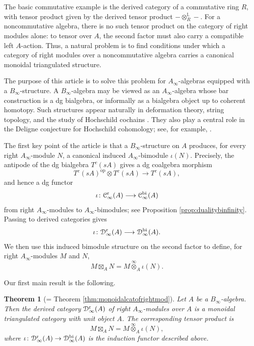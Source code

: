 \documentclass[a4paper, 11pt]{amsart}
\newtheorem{thmy}{Theorem}
\theoremstyle{definition}
\theoremstyle{remark}
\numberwithin{equation}{section}
\newcommand{\RR}{\mathrm{r}}
\newcommand{\BB}{\mathrm{bi}}
\newcommand{\op}{\mathrm{op}}
\newcommand{\EC}{\EuScript{C}}
\newcommand{\ED}{\EuScript{D}}
\begin{document}
The basic commutative example is the derived category of a commutative ring $R$, with tensor product given by the derived tensor product $-\otimes_R^{\mathbb L}-$. For a noncommutative algebra, there is no such tensor product on the category of right modules alone: to tensor over $A$, the second factor must also carry a compatible left $A$-action. Thus, a natural problem is to find conditions under which a category of right modules over a noncommutative algebra carries a canonical monoidal triangulated structure.

The purpose of this article is to solve this problem for $A_\infty$-algebras equipped with a $B_\infty$-structure. A $B_\infty$-algebra may be viewed as an $A_\infty$-algebra whose bar construction is a dg bialgebra, or informally as a bialgebra object up to coherent homotopy. Such structures appear naturally in deformation theory, string topology, and the study of Hochschild cochains \cite{Ba, GeVo, GJ, Kel03, LoVa1, Vor}. They also play a central role in the Deligne conjecture for Hochschild cohomology; see, for example, \cite{KoSo, MS, Ta, Vor}.

The first key point of the article is that a $B_\infty$-structure on $A$ produces, for every right $A_\infty$-module $N$, a canonical induced $A_\infty$-bimodule $\iota(N)$. 
Precisely, the antipode of the dg bialgebra $T^c(sA)$ gives a dg coalgebra morphism
\[
T^c(sA)^{\op}\otimes T^c(sA)\longrightarrow T^c(sA),
\]
and hence a dg functor
\[
\iota\colon \EC^{\RR}_\infty(A)\longrightarrow \EC^{\BB}_\infty(A)
\]
from right $A_\infty$-modules to $A_\infty$-bimodules; see Proposition \ref{prop:dualitybinfinity}. Passing to derived categories gives
\[
\iota\colon \ED^{\RR}_\infty(A)\longrightarrow \ED^{\BB}_\infty(A).
\]
We then use this induced bimodule structure on the second factor to define, for right $A_\infty$-modules $M$ and $N$,
\[
M\boxtimes_A N=M\overset{\infty}{\otimes}_A\iota(N).
\]

Our first main result is the following.

\begin{thmy}[= Theorem \ref{thm:monoidalcatofrightmod}] \label{thmA}
Let $A$ be a $B_\infty$-algebra.
Then the derived category $\ED^{\RR}_\infty(A)$ of right $A_\infty$-modules over $A$ is a monoidal triangulated category with unit object $A$.
The corresponding tensor product is
\[
M \boxtimes_A N = M \overset{\infty}{\otimes}_A \iota(N),
\]
where $\iota\colon \ED^{\RR}_\infty(A) \to \ED^{\BB}_\infty(A)$ is the induction functor described above.
\end{thmy}
\end{document}
